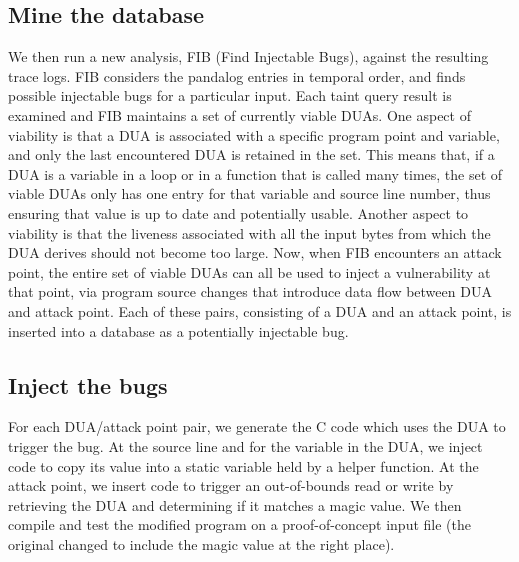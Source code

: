 \subsection{Mine the database}
We then run a new analysis, FIB (Find Injectable Bugs), against the resulting trace logs.
FIB considers the pandalog entries in temporal order, and finds possible injectable bugs for a particular input.
Each taint query result is examined and FIB maintains a set of currently viable DUAs.
One aspect of viability is that a DUA is associated with a specific program point and variable, and only the last encountered DUA is retained in the set. 
This means that, if a DUA is a variable in a loop or in a function that is called many times, the set of viable DUAs only has one
entry for that variable and source line number, thus ensuring that value is up to date and potentially usable.  
Another aspect to viability is that the liveness associated with all the input bytes from which the DUA derives should not become too large.
Now, when FIB encounters an attack point, the entire set of viable DUAs can all be used to inject a vulnerability at that point, via program source changes that introduce data flow between DUA and attack point. 
Each of these pairs, consisting of a DUA and an attack point, is inserted into a database as a potentially injectable bug.  

\subsection{Inject the bugs}
For each DUA/attack point pair, we generate the C code which uses the DUA to trigger the bug.
At the source line and for the variable in the DUA, we inject code to copy its value into a static variable held by a helper function.
At the attack point, we insert code to trigger an out-of-bounds read or write by retrieving the DUA and determining if it matches a magic value.
We then compile and test the modified program on a proof-of-concept input file (the original changed to include the magic value at the right place).
